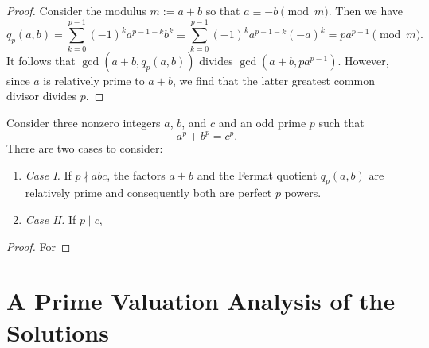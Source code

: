\begin{proof}
  Consider the modulus $m:=a+b$ so that $a\equiv -b\pmod{m}$. Then we have
  \begin{equation*}
    q_p(a,b)=\sum_{k=0}^{p-1}(-1)^ka^{p-1-k}b^k \equiv \sum_{k=0}^{p-1} (-1)^ka^{p-1-k}(-a)^k= pa^{p-1} \pmod{m}.
  \end{equation*}
  It follows that $\gcd(a+b,q_p(a,b))$ divides $\gcd(a+b,pa^{p-1})$. However, since $a$ is relatively prime to $a+b$, we find that the latter greatest common divisor divides $p$.
\end{proof}

\begin{theorem}
  Consider three nonzero integers $a$, $b$, and $c$ and an odd prime $p$ such that
  \begin{equation*}
    a^p+b^p=c^p.
  \end{equation*}
  There are two cases to consider:
  \begin{enumerate}
  \item \emph{Case I.} If $p\nmid abc$, the factors $a+b$ and the Fermat quotient $q_p(a,b)$ are relatively prime and consequently both are perfect $p$\supth{} powers.
  \item \emph{Case II.} If $p\mid c$, 
  \end{enumerate}
\end{theorem}

\begin{proof}
  For 
\end{proof}

\section{A Prime Valuation Analysis of the Solutions}

